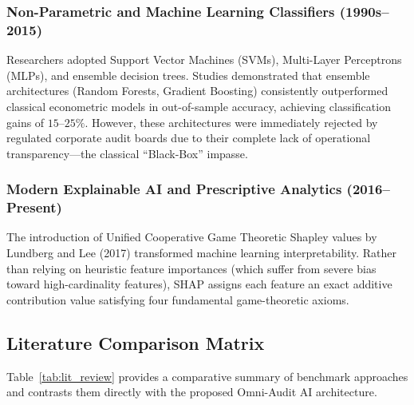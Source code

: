 \documentclass[11pt, a4paper]{article}
\begin{document}
\subsubsection{Non-Parametric and Machine Learning Classifiers (1990s--2015)}
Researchers adopted Support Vector Machines (SVMs), Multi-Layer Perceptrons (MLPs), and ensemble decision trees. Studies demonstrated that ensemble architectures (Random Forests, Gradient Boosting) consistently outperformed classical econometric models in out-of-sample accuracy, achieving classification gains of $15\text{--}25\%$. However, these architectures were immediately rejected by regulated corporate audit boards due to their complete lack of operational transparency---the classical ``Black-Box'' impasse.

\subsubsection{Modern Explainable AI and Prescriptive Analytics (2016--Present)}
The introduction of Unified Cooperative Game Theoretic Shapley values by Lundberg and Lee (2017) transformed machine learning interpretability. Rather than relying on heuristic feature importances (which suffer from severe bias toward high-cardinality features), SHAP assigns each feature an exact additive contribution value satisfying four fundamental game-theoretic axioms. 

\subsection{Literature Comparison Matrix}
Table~\ref{tab:lit_review} provides a comparative summary of benchmark approaches and contrasts them directly with the proposed Omni-Audit AI architecture.
\end{document}

